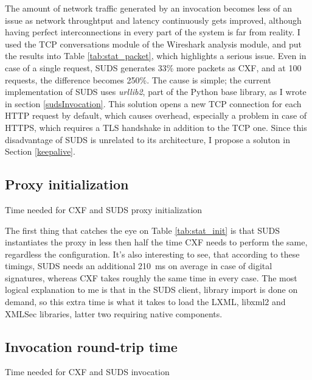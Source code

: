 \noindent
The amount of network traffic generated by an invocation becomes less of an issue as network throughtput and latency continuously gets improved, although having perfect interconnections in every part of the system is far from reality. I used the TCP conversations module of the Wireshark analysis module, and put the results into Table \ref{tab:stat_packet}, which highlights a serious issue. Even in case of a single request, SUDS generates 33\% more packets as CXF, and at 100 requests, the difference becomes 250\%. The cause is simple; the current implementation of SUDS uses \emph{urllib2}, part of the Python base library, as I wrote in section \ref{sudsInvocation}. This solution opens a new TCP connection for each HTTP request by default, which causes overhead, especially a problem in case of HTTPS, which requires a TLS handshake in addition to the TCP one. Since this disadvantage of SUDS is unrelated to its architecture, I propose a soluton in Section \ref{keepalive}.

\subsection{Proxy initialization}

\begin{table}[htbp]
 \begin{center}
  
  \caption{Time needed for CXF and SUDS proxy initialization}
  \label{tab:stat_init}
 \end{center}
\end{table}

\noindent
The first thing that catches the eye on Table \ref{tab:stat_init} is that SUDS instantiates the proxy in less then half the time CXF needs to perform the same, regardless the configuration. It's also interesting to see, that according to these timings, SUDS needs an additional \mbox{210 ms} on average in case of digital signatures, whereas CXF takes roughly the same time in every case. The most logical explanation to me is that in the SUDS client, library import is done on demand, so this extra time is what it takes to load the LXML, libxml2 and XMLSec libraries, latter two requiring native components.

\subsection{Invocation round-trip time}

\begin{table}[htbp]
 \begin{center}
  
  \caption{Time needed for CXF and SUDS invocation}
  \label{tab:stat_invoke}
 \end{center}
\end{table}

